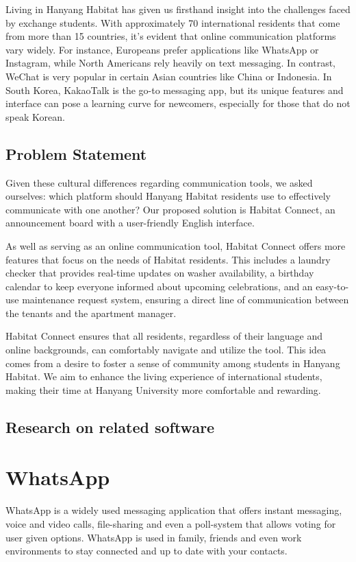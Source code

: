 \documentclass[conference]{IEEEtran}
\begin{document}
Living in Hanyang Habitat has given us firsthand insight into the challenges faced by exchange students. With approximately 70 international residents that come from more than 15 countries, it's evident that online communication platforms vary widely. For instance, Europeans prefer applications like WhatsApp or Instagram, while North Americans rely heavily on text messaging. In contrast, WeChat is very popular in certain Asian countries like China or Indonesia. In South Korea, KakaoTalk is the go-to messaging app, but its unique features and interface can pose a learning curve for newcomers, especially for those that do not speak Korean.
\subsection{Problem Statement}
Given these cultural differences regarding communication tools, we asked ourselves: which platform should Hanyang Habitat residents use to effectively communicate with one another? Our proposed solution is Habitat Connect, an announcement board with a user-friendly English interface.

As well as serving as an online communication tool, Habitat Connect offers more features that focus on the needs of Habitat residents. This includes a laundry checker that provides real-time updates on washer availability, a birthday calendar to keep everyone informed about upcoming celebrations, and an easy-to-use maintenance request system, ensuring a direct line of communication between the tenants and the apartment manager.

Habitat Connect ensures that all residents, regardless of their language and online backgrounds, can comfortably navigate and utilize the tool. This idea comes from a desire to foster a sense of community among students in Hanyang Habitat. We aim to enhance the living experience of international students, making their time at Hanyang University more comfortable and rewarding.  
\subsection{Research on related software}
\section*{WhatsApp}
WhatsApp is a widely used messaging application that offers instant messaging, voice and video calls, file-sharing and even a poll-system that allows voting for user given options. WhatsApp is used in family, friends and even work environments to stay connected and up to date with your contacts.
\end{document}
